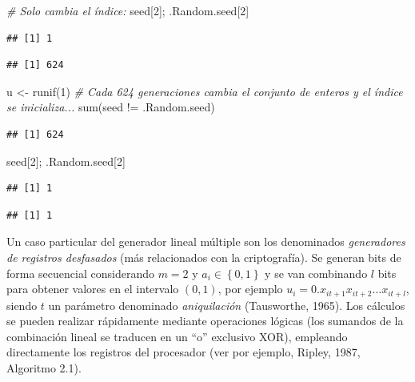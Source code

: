 \documentclass[
]{book}
\newenvironment{Shaded}{\begin{snugshade}}{\end{snugshade}}
\newcommand{\CommentTok}[1]{\textcolor[rgb]{0.56,0.35,0.01}{\textit{#1}}}
\newcommand{\DecValTok}[1]{\textcolor[rgb]{0.00,0.00,0.81}{#1}}
\newcommand{\FunctionTok}[1]{\textcolor[rgb]{0.00,0.00,0.00}{#1}}
\newcommand{\NormalTok}[1]{#1}
\newcommand{\OtherTok}[1]{\textcolor[rgb]{0.56,0.35,0.01}{#1}}
\newcommand{\SpecialCharTok}[1]{\textcolor[rgb]{0.00,0.00,0.00}{#1}}
\theoremstyle{break}
\theoremstyle{definition}
\theoremstyle{definition}
\theoremstyle{definition}
\theoremstyle{definition}
\theoremstyle{remark}
\begin{document}
\begin{Shaded}
\begin{Highlighting}[]
\CommentTok{\# Solo cambia el índice: }
\NormalTok{seed[}\DecValTok{2}\NormalTok{]; .Random.seed[}\DecValTok{2}\NormalTok{]}
\end{Highlighting}
\end{Shaded}

\begin{verbatim}
## [1] 1
\end{verbatim}

\begin{verbatim}
## [1] 624
\end{verbatim}

\begin{Shaded}
\begin{Highlighting}[]
\NormalTok{u }\OtherTok{\textless{}{-}} \FunctionTok{runif}\NormalTok{(}\DecValTok{1}\NormalTok{)}
\CommentTok{\# Cada 624 generaciones cambia el conjunto de enteros y el índice se inicializa...}
\FunctionTok{sum}\NormalTok{(seed }\SpecialCharTok{!=}\NormalTok{ .Random.seed)}
\end{Highlighting}
\end{Shaded}

\begin{verbatim}
## [1] 624
\end{verbatim}

\begin{Shaded}
\begin{Highlighting}[]
\NormalTok{seed[}\DecValTok{2}\NormalTok{]; .Random.seed[}\DecValTok{2}\NormalTok{]}
\end{Highlighting}
\end{Shaded}

\begin{verbatim}
## [1] 1
\end{verbatim}

\begin{verbatim}
## [1] 1
\end{verbatim}

Un caso particular del generador lineal múltiple son los denominados \emph{generadores de registros desfasados} (más relacionados con la criptografía).
Se generan bits de forma secuencial considerando \(m=2\) y \(a_{i} \in \left \{ 0,1\right \}\) y se van combinando \(l\) bits para obtener valores en el intervalo \((0, 1)\), por ejemplo \(u_i = 0 . x_{it+1} x_{it+2} \ldots x_{it+l}\), siendo \(t\) un parámetro denominado \emph{aniquilación} (Tausworthe, 1965).
Los cálculos se pueden realizar rápidamente mediante operaciones lógicas (los sumandos de la combinación lineal se traducen en un ``o'' exclusivo XOR), empleando directamente los registros del procesador (ver por ejemplo, Ripley, 1987, Algoritmo 2.1).
\end{document}
